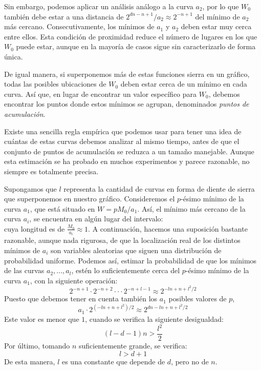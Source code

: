     Sin embargo, podemos aplicar un análisis análogo a la curva $a_{2}$, por lo que $W_{0}$ también debe estar a una distancia de $2^{dn - n + 1} / a_{2} \approx 2^{-n + 1}$ del mínimo de $a_{2}$ más cercano. Consecutivamente, los mínimos de $a_{1}$ y $a_{2}$ deben estar muy cerca entre ellos. Esta condición de proximidad reduce el número de lugares en los que $W_{0}$ puede estar, aunque en la mayoría de casos sigue sin caracterizarlo de forma única.

    De igual manera, si superponemos más de estas funciones sierra en un gráfico, todas las posibles ubicaciones de $W_{0}$ deben estar cerca de un mínimo en cada curva. Así que, en lugar de encontrar un valor específico para $W_{0}$, debemos encontrar los puntos donde estos mínimos se agrupan, denominados \textit{puntos de acumulación}.

    Existe una sencilla regla empírica que podemos usar para tener una idea de cuántas de estas curvas debemos analizar al mismo tiempo, antes de que el conjunto de puntos de acumulación se reduzca a un tamaño manejable. Aunque esta estimación se ha probado en muchos experimentos y parece razonable, no siempre es totalmente precisa.

    Supongamos que $l$ representa la cantidad de curvas en forma de diente de sierra que superponemos en nuestro gráfico. Consideremos el $p$-ésimo mínimo de la curva $a_{1}$, que está situado en $W = pM_{0}/a_{1}$. Así, el mínimo más cercano de la curva $a_{i}$, se encuentra en algún lugar del intervalo:
    \begin{equation}
        [\frac{pM_{0}}{a_{1}} - \frac{M_{0}}{2a_{i}}, \frac{pM_{0}}{a_{1}} + \frac{M_{0}}{2a_{i}}]
    \end{equation}
    cuya longitud es de $\frac{M_{0}}{a_{i}} \approx 1$. A continuación, hacemos una suposición bastante razonable, aunque nada rigurosa, de que la localización real de los distintos mínimos de $a_{i}$ son variables aleatorias que siguen una distribución de probabilidad uniforme. Podemos así, estimar la probabilidad de que los mínimos de las curvas $a_{2}, ... , a_{l}$, estén lo suficientemente cerca del $p$-ésimo mínimo de la curva $a_{1}$, con la siguiente operación:
    \begin{equation}
        2^{-n + 1} \cdot 2^{-n + 2} \cdot \cdot \cdot 2^{-n + l - 1} \approx 2^{-ln + n + l^{2}/2}
    \end{equation}
    Puesto que debemos tener en cuenta también los $a_{1}$ posibles valores de $p$,
    \begin{equation}
        a_{1} \cdot 2^{(-ln + n + l^{2})/2} \approx 2^{dn - ln + n + l^{2}/2}
    \end{equation}
    Este valor es menor que $1$, cuando se verifica la siguiente desigualdad:
    \begin{equation}
        (l - d - 1)n > \frac{l^{2}}{2}
    \end{equation}
    Por último, tomando $n$ suficientemente grande, se verifica:
    \begin{equation}
        l > d + 1
    \end{equation}
    De esta manera, $l$ es una constante que depende de $d$, pero no de $n$. 
    
